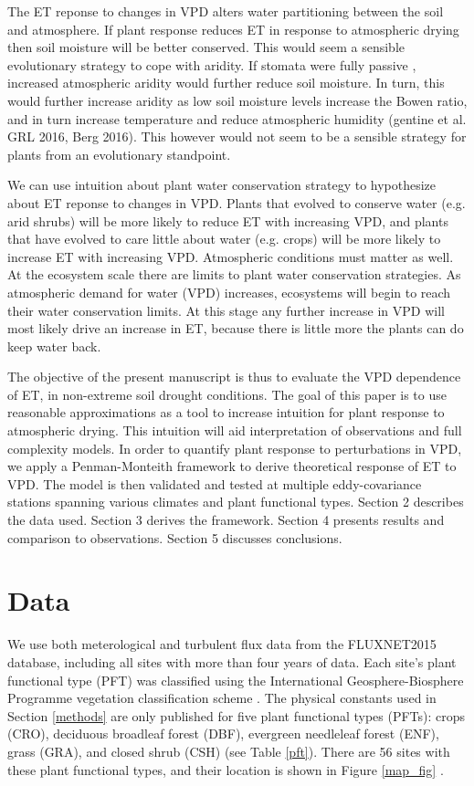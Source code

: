 \documentclass[draft,linenumbers]{agujournal}
\begin{document}
The ET reponse to changes in VPD alters water partitioning between the soil and atmosphere. If plant response reduces ET in response to atmospheric drying then soil moisture will be better conserved. This would seem a sensible evolutionary strategy to cope with aridity. If stomata were fully passive \citep [similar to soil pores, e.g. ][]{Or_2013}, increased atmospheric aridity would further reduce soil moisture. In turn, this would further increase aridity as low soil moisture levels increase the Bowen ratio, and in turn increase temperature and reduce atmospheric humidity (gentine et al. GRL 2016, Berg 2016).  This however would not seem to be a sensible strategy for plants from an evolutionary standpoint.

We can use intuition about plant water conservation strategy to hypothesize about ET reponse to changes in VPD. Plants that evolved to conserve water (e.g. arid shrubs) will be more likely to reduce ET with increasing VPD, and plants that have evolved to care little about water (e.g. crops) will be more likely to increase ET with increasing VPD. Atmospheric conditions must matter as well. At the ecosystem scale there are limits to plant water conservation strategies. As atmospheric demand for water (VPD) increases, ecosystems will begin to reach their water conservation limits. At this stage any further increase in VPD will most likely drive an increase in ET, because there is little more the plants can do keep water back. 

The objective of the present manuscript is thus to evaluate the VPD dependence of ET, in non-extreme soil drought conditions. The goal of this paper is to use reasonable approximations as a tool to increase intuition for plant response to atmospheric drying. This intuition will aid interpretation of observations and full complexity models. In order to quantify plant response to perturbations in VPD, we apply a Penman-Monteith framework to derive theoretical response of ET to VPD. The model is then validated and tested at multiple eddy-covariance stations spanning various climates and plant functional types. Section 2 describes the data used. Section 3 derives the framework. Section 4 presents results and comparison to observations. Section 5 discusses conclusions. 

\section{Data}
\label{data}
We use both meterological and turbulent flux data from the FLUXNET2015 database, including all sites with more than four years of data. Each site's plant functional type (PFT) was classified using the International Geosphere-Biosphere Programme vegetation classification scheme \citep{Loveland_1999}. The physical constants used in Section \ref{methods} are only published for five plant functional types (PFTs): crops (CRO), deciduous broadleaf forest (DBF), evergreen needleleaf forest (ENF), grass (GRA), and closed shrub (CSH) (see Table \ref{pft}). There are 56 sites with these plant functional types, and their location is shown in  Figure \ref{map_fig} .
\end{document}
